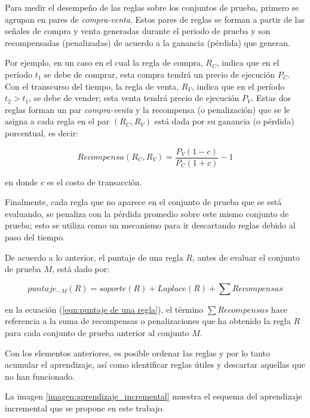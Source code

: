 \documentclass[12pt]{report}
\theoremstyle{break}
\theoremstyle{break}
\begin{document}
Para medir el desempeño de las reglas sobre los conjuntos de prueba, primero se agrupan en pares de \textit{compra-venta}. Estos pares de reglas se forman a partir de las señales de compra y venta generadas durante el periodo de prueba y son recompensadas (penalizadas) de acuerdo a la ganancia (pérdida) que generan.

Por ejemplo, en un caso en el cual la regla de compra, $R_{C}$, indica que en el período $t_1$ se debe de comprar, esta compra tendrá un precio de ejecución $P_{C}$. Con el transcurso del tiempo, la regla de venta, $R_{V}$, indica que en el período $t_2 > t_1$, se debe de vender; esta venta tendrá precio de ejecución $P_{V}$. Estas dos reglas forman un par \textit{compra-venta} y la recompensa (o penalización) que se le asigna a cada regla en el par $\left(R_C, R_V\right)$ está dada por su ganancia (o pérdida) porcentual, es decir:

\begin{equation}\label{eqn:recompensa reglas}
Recompensa(R_C, R_V) = \dfrac{P_V (1 - c)}{P_C (1 + c) } - 1
\end{equation}

en donde $c$ es el costo de transacción.

Finalmente, cada regla que no aparece en el conjunto de prueba que se está evaluando, se penaliza con la pérdida promedio sobre este mismo conjunto de prueba; esto se utiliza como un mecanismo para ir descartando reglas debido al paso del tiempo.

De acuerdo a lo anterior, el puntaje de una regla $R$, antes de evaluar el conjunto de prueba $M$, está dado por:

\begin{equation} \label{eqn:puntaje de una regla}
puntaje_{-M}(R) = soporte(R) + Laplace(R) + \sum Recompensas
\end{equation}

en la ecuación (\ref{eqn:puntaje de una regla}), el término $ \sum Recompensas$ hace referencia a la suma de recompensas o penalizaciones que ha obtenido la regla $R$ para cada conjunto de prueba anterior al conjunto $M$.

Con los elementos anteriores, es posible ordenar las reglas y por lo tanto acumular el aprendizaje, así como identificar reglas útiles y descartar aquellas que no han funcionado.

La imagen \ref{imagen:aprendizaje_incremental} muestra el esquema del aprendizaje incremental que se propone en este trabajo.
\end{document}
